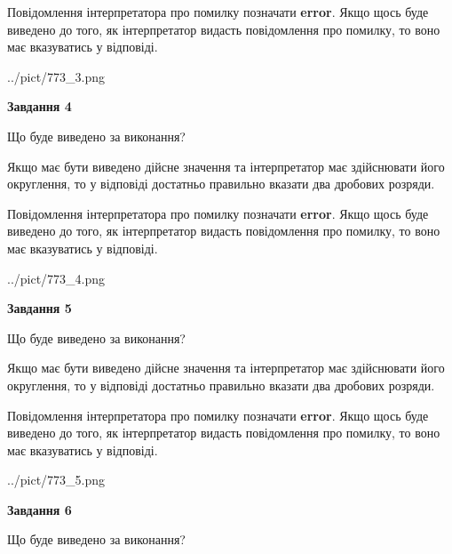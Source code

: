 \documentclass[12pt, ukrainian]{article}
\begin{document}
{\begin {Large}
Повідомлення інтерпретатора про помилку позначати \textbf{error}.
Якщо щось буде виведено до того, як інтерпретатор видасть повідомлення про помилку, 
то воно має вказуватись у відповіді. \par

\begin{center}
	{../pict/773_3.png}
\end{center}
\newpage

{\begin {center}\textbf{Завдання 4}\end {center}}\par
Що буде виведено за виконання? \par

Якщо має бути виведено дійсне значення та інтерпретатор має здійснювати його округлення, 
то у відповіді достатньо правильно вказати два дробових розряди.

Повідомлення інтерпретатора про помилку позначати \textbf{error}.
Якщо щось буде виведено до того, як інтерпретатор видасть повідомлення про помилку, 
то воно має вказуватись у відповіді. \par

\begin{center}
	{../pict/773_4.png}
\end{center}
\newpage

{\begin {center}\textbf{Завдання 5}\end {center}}\par
Що буде виведено за виконання? \par

Якщо має бути виведено дійсне значення та інтерпретатор має здійснювати його округлення, 
то у відповіді достатньо правильно вказати два дробових розряди.

Повідомлення інтерпретатора про помилку позначати \textbf{error}.
Якщо щось буде виведено до того, як інтерпретатор видасть повідомлення про помилку, 
то воно має вказуватись у відповіді. \par

\begin{center}
	{../pict/773_5.png}
\end{center}
\newpage

{\begin {center}\textbf{Завдання 6}\end {center}}\par
Що буде виведено за виконання? \par


\end{Large}}
\end{document}
